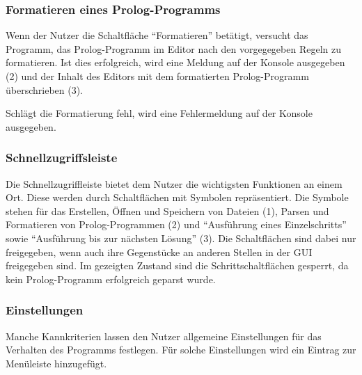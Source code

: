 \documentclass[parskip=full,11pt,twoside]{scrartcl}
\begin{document}
\subsubsection{Formatieren eines Prolog-Programms}

\begin{minipage}{\linewidth}
\end{minipage}

Wenn der Nutzer die Schaltfläche \enquote{Formatieren} betätigt, versucht das Programm, das Prolog-Programm im Editor nach den vorgegegeben Regeln zu formatieren.
Ist dies erfolgreich, wird eine Meldung auf der Konsole ausgegeben (2) und der Inhalt des Editors mit dem formatierten Prolog-Programm überschrieben (3).

Schlägt die Formatierung fehl, wird eine Fehlermeldung auf der Konsole ausgegeben.

\subsubsection{Schnellzugriffsleiste}

\begin{minipage}{\linewidth}
\end{minipage}

Die Schnellzugriffleiste bietet dem Nutzer die wichtigsten Funktionen an einem Ort.
Diese werden durch Schaltflächen mit Symbolen repräsentiert.
Die Symbole stehen für das Erstellen, Öffnen und Speichern von Dateien (1), Parsen und Formatieren von Prolog-Programmen (2) und \enquote{Ausführung eines Einzelschritts} sowie \enquote{Ausführung bis zur nächsten Lösung} (3).
Die Schaltflächen sind dabei nur freigegeben, wenn auch ihre Gegenstücke an anderen Stellen in der GUI freigegeben sind.
Im gezeigten Zustand sind die Schrittschaltflächen gesperrt, da kein Prolog-Programm erfolgreich geparst wurde.

\subsubsection{Einstellungen}

Manche Kannkriterien lassen den Nutzer allgemeine Einstellungen für das Verhalten des Programms festlegen.
Für solche Einstellungen wird ein Eintrag zur Menüleiste hinzugefügt.
\end{document}
